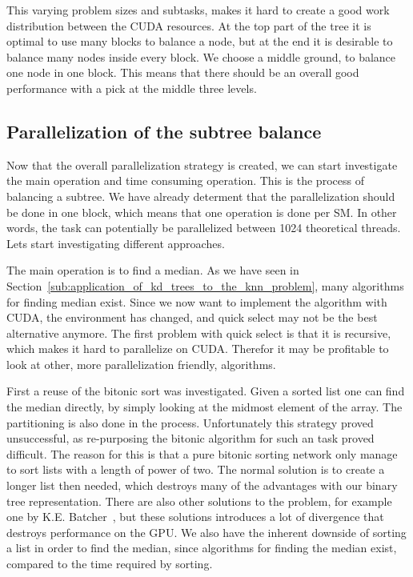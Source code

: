 This varying problem sizes and subtasks, makes it hard to create a good work distribution between the CUDA resources. At the top part of the tree it is optimal to use many blocks to balance a node, but at the end it is desirable to balance many nodes inside every block. We choose a middle ground, to balance one node in one block. This means that there should be an overall good performance with a pick at the middle three levels.



\subsection{Parallelization of the subtree balance} %
\label{ssub:selecting_a_algorithm}


Now that the overall parallelization strategy is created, we can start investigate the main operation and time consuming operation. This is the process of balancing a subtree. We have already determent that the parallelization should be done in one block, which means that one operation is done per SM\@. In other words, the task can potentially be parallelized between 1024 theoretical threads. Lets start investigating different approaches.

The main operation is to find a median. As we have seen in Section~\ref{sub:application_of_kd_trees_to_the_knn_problem}, many algorithms for finding median exist. Since we now want to implement the algorithm with CUDA, the environment has changed, and quick select may not be the best alternative anymore. The first problem with quick select is that it is recursive, which makes it hard to parallelize on CUDA\@. Therefor it may be profitable to look at other, more parallelization friendly, algorithms.


First a reuse of the bitonic sort was investigated. Given a sorted list one can find the median directly, by simply looking at the midmost element of the array. The partitioning is also done in the process. Unfortunately this strategy proved unsuccessful, as re-purposing the bitonic algorithm for such an task proved difficult. The reason for this is that a pure bitonic sorting network only manage to sort lists with a length of power of two. The normal solution is to create a longer list then needed, which destroys many of the advantages with our binary tree representation. There are also other solutions to the problem, for example one by K.E. Batcher~\cite{Batcher:1968}, but these solutions introduces a lot of divergence that destroys performance on the GPU\@. We also have the inherent downside of sorting a list in order to find the median, since  algorithms for finding the median exist, compared to the  time required by sorting.


